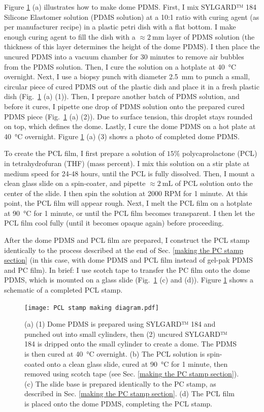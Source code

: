 \documentclass[double,12pt,1in,seploa]{beavtex}
\begin{document}
Figure \ref{PCL stamp making diagram} (a) illustrates how to make dome PDMS. First, I mix SYLGARD™ 184 Silicone Elastomer solution (PDMS solution) at a 10:1 ratio with curing agent (as per manufacturer recipe) in a plastic petri dish with a flat bottom. I make enough curing agent to fill the dish with a $\approx \SI{2}{\milli\meter}$ layer of PDMS solution (the thickness of this layer determines the height of the dome PDMS). I then place the uncured PDMS into a vacuum chamber for 30 minutes to remove air bubbles from the PDMS solution. Then, I cure the solution on a hotplate at \SI{40}{\celsius} overnight. Next, I use a biopsy punch with diameter \SI{2.5}{\milli\meter} to punch a small, circular piece of cured PDMS out of the plastic dish and place it in a fresh plastic dish (Fig.\ \ref{PCL stamp making diagram} (a) (1)). Then, I prepare another batch of PDMS solution, and before it cures, I pipette one drop of PDMS solution onto the prepared cured PDMS piece (Fig.\ \ref{PCL stamp making diagram} (a) (2)). Due to surface tension, this droplet stays rounded on top, which defines the dome. Lastly, I cure the dome PDMS on a hot plate at \SI{40}{\celsius} overnight. Figure \ref{PCL stamp making diagram} (a) (3) shows a photo of completed dome PDMS.

To create the PCL film, I first prepare a solution of $15 \%$ polycaprolactone (PCL) in tetrahydrofuran (THF) (mass percent). I mix this solution on a stir plate at medium speed for 24-48 hours, until the PCL is fully dissolved. Then, I mount a clean glass slide on a spin-coater, and pipette $\approx \SI{2}{\milli\liter}$ of PCL solution onto the center of the slide. I then spin the solution at 2000 RPM for 1 minute. At this point, the PCL film will appear rough. Next, I melt the PCL film on a hotplate at \SI{90}{\celsius} for 1 minute, or until the PCL film becomes transparent. I then let the PCL film cool fully (until it becomes opaque again) before proceeding.

After the dome PDMS and PCL film are prepared, I construct the PCL stamp identically to the process described at the end of Sec. \ref{making the PC stamp section} (in this case, with dome PDMS and PCL film instead of gel-pak PDMS and PC film). In brief: I use scotch tape to transfer the PC film onto the dome PDMS, which is mounted on a glass slide (Fig.\ \ref{PCL stamp making diagram} (c) and (d)). Figure \ref{PCL stamp making diagram} shows a schematic of a completed PCL stamp.

\begin{figure}
    \texttt{[image: PCL stamp making diagram.pdf]}
    \caption{(a) (1) Dome PDMS is prepared using SYLGARD™ 184 and punched out into small cylinders, then (2) uncured SYLGARD™ 184 is dripped onto the small cylinder to create a dome. The PDMS is then cured at \SI{40}{\celsius} overnight. (b) The PCL solution is spin-coated onto a clean glass slide, cured at \SI{90}{\celsius} for 1 minute, then removed using scotch tape (see Sec. \ref{making the PC stamp section}). (c) The slide base is prepared identically to the PC stamp, as described in Sec. \ref{making the PC stamp section}. (d) The PCL film is placed onto the dome PDMS, completing the PCL stamp.}
    \label{PCL stamp making diagram}
\end{figure}
\end{document}
